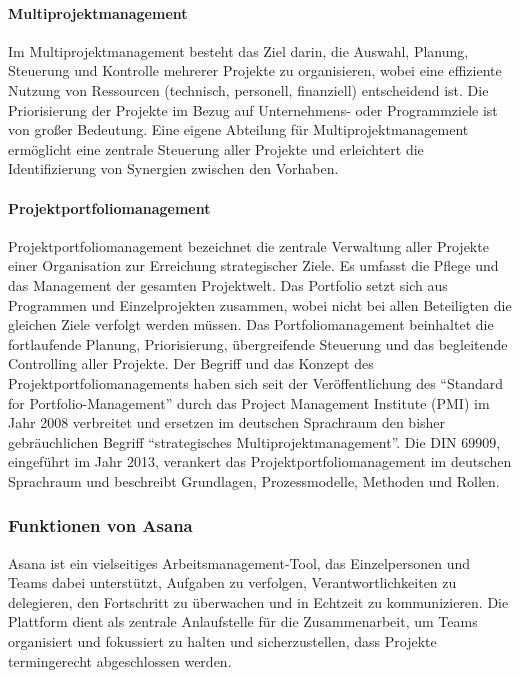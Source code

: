 \documentclass[sigconf, nonacm]{acmart}
\begin{document}
\paragraph{Multiprojektmanagement}
Im Multiprojektmanagement besteht das Ziel darin, die Auswahl, Planung, Steuerung und Kontrolle mehrerer Projekte zu organisieren, wobei eine effiziente Nutzung von Ressourcen (technisch, personell, finanziell) entscheidend ist. Die Priorisierung der Projekte im Bezug auf Unternehmens- oder Programmziele ist von großer Bedeutung. Eine eigene Abteilung für Multiprojektmanagement ermöglicht eine zentrale Steuerung aller Projekte und erleichtert die Identifizierung von Synergien zwischen den Vorhaben.~\cite{venzmer_multiprojektmanagement-software_2020}

\paragraph{Projektportfoliomanagement }
Projektportfoliomanagement bezeichnet die zentrale Verwaltung aller Projekte einer Organisation zur Erreichung strategischer Ziele. Es umfasst die Pflege und das Management der gesamten Projektwelt. Das Portfolio setzt sich aus Programmen und Einzelprojekten zusammen, wobei nicht bei allen Beteiligten die gleichen Ziele verfolgt werden müssen. Das Portfoliomanagement beinhaltet die fortlaufende Planung, Priorisierung, übergreifende Steuerung und das begleitende Controlling aller Projekte. Der Begriff und das Konzept des Projektportfoliomanagements haben sich seit der Veröffentlichung des \enquote{Standard for Portfolio-Management} durch das Project Management Institute (PMI) im Jahr 2008 verbreitet und ersetzen im deutschen Sprachraum den bisher gebräuchlichen Begriff \enquote{strategisches Multiprojektmanagement}. Die DIN 69909, eingeführt im Jahr 2013, verankert das Projektportfoliomanagement im deutschen Sprachraum und beschreibt Grundlagen, Prozessmodelle, Methoden und Rollen.~\cite{gmbh_detailseite_nodate}

\subsubsection{Funktionen von Asana}
Asana ist ein vielseitiges Arbeitsmanagement-Tool, das Einzelpersonen und Teams dabei unterstützt, Aufgaben zu verfolgen, Verantwortlichkeiten zu delegieren, den Fortschritt zu überwachen und in Echtzeit zu kommunizieren. Die Plattform dient als zentrale Anlaufstelle für die Zusammenarbeit, um Teams organisiert und fokussiert zu halten und sicherzustellen, dass Projekte termingerecht abgeschlossen werden.
\\
\end{document}
